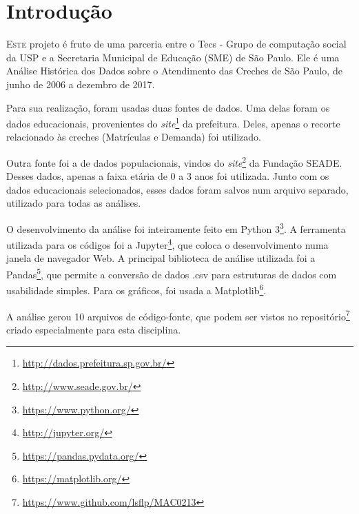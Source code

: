 \chapter{Introdução}

\lettrine{E}{ste} projeto é fruto de uma parceria entre o Tecs - Grupo de computação social da USP e a Secretaria Municipal de Educação (SME) de São Paulo. Ele é uma Análise Histórica dos Dados sobre o Atendimento das Creches de São Paulo, de junho de 2006 a dezembro de 2017.

Para sua realização, foram usadas duas fontes de dados. Uma delas foram os dados educacionais, provenientes do \textit{site}\footnote{\url{http://dados.prefeitura.sp.gov.br/}} da prefeitura. Deles, apenas o recorte relacionado às creches (Matrículas e Demanda) foi utilizado. 

Outra fonte foi a de dados populacionais, vindos do \textit{site}\footnote{\url{http://www.seade.gov.br/}} da Fundação SEADE. Desses dados, apenas a faixa etária de 0 a 3 anos foi utilizada. Junto com os dados educacionais selecionados, esses dados foram salvos num arquivo separado, utilizado para todas as análises.

O desenvolvimento da análise foi inteiramente feito em Python 3\footnote{\url{https://www.python.org/}}. A ferramenta utilizada para os códigos foi a Jupyter\footnote{\url{http://jupyter.org/}}, que coloca o desenvolvimento numa janela de navegador Web. A principal biblioteca de análise utilizada foi a Pandas\footnote{\url{https://pandas.pydata.org/}}, que permite a conversão de dados .csv para estruturas de dados com usabilidade simples. Para os gráficos, foi usada a Matplotlib\footnote{\url{https://matplotlib.org/}}.

A análise gerou 10 arquivos de código-fonte, que podem ser vistos no repositório\footnote{\url{https://www.github.com/lsflp/MAC0213}} criado especialmente para esta disciplina.